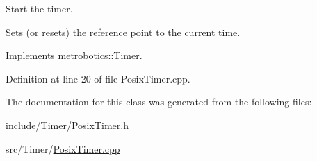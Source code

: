 \-Start the timer. 

\-Sets (or resets) the reference point to the current time. 

\-Implements \hyperlink{classmetrobotics_1_1Timer_afac918d950d5760a630913791b33fa9a}{metrobotics\-::\-Timer}.



\-Definition at line 20 of file \-Posix\-Timer.\-cpp.



\-The documentation for this class was generated from the following files\-:\begin{DoxyCompactItemize}
\item 
include/\-Timer/\hyperlink{PosixTimer_8h}{\-Posix\-Timer.\-h}\item 
src/\-Timer/\hyperlink{PosixTimer_8cpp}{\-Posix\-Timer.\-cpp}\end{DoxyCompactItemize}
